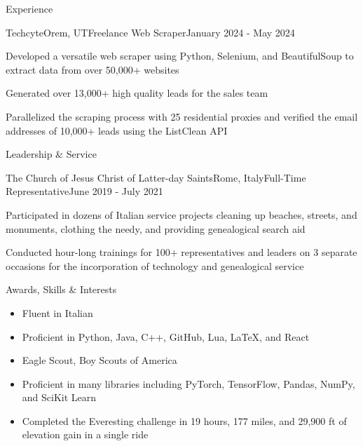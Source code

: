 \documentclass[
	10pt,
]{resume}
\begin{document}
\begin{rSection}{Experience}
\begin{rSubsection}{Techcyte}{Orem, UT}{Freelance Web Scraper}{January 2024 - May 2024}
		\item Developed a versatile web scraper using Python, Selenium, and BeautifulSoup to extract data from over 50,000+ websites
		\item Generated over 13,000+ high quality leads for the sales team
    \item Parallelized the scraping process with 25 residential proxies and verified the email addresses of 10,000+ leads using the ListClean API
	\end{rSubsection}


\end{rSection}


\begin{rSection}{Leadership \& Service}

	\begin{rSubsection}{The Church of Jesus Christ of Latter-day Saints}{Rome, Italy}{Full-Time Representative}{June 2019 - July 2021}
		\item Participated in dozens of Italian service projects cleaning up beaches, streets, and monuments, clothing the needy,
		and providing genealogical search aid
		\item Conducted hour-long trainings for 100+ representatives and leaders on 3 separate occasions for the incorporation of
		technology and genealogical service
	\end{rSubsection}

\end{rSection}

\begin{rSection}{Awards, Skills \& Interests}
	\begin{multicols}{2} %
		\begin{itemize}
			\item Fluent in Italian
			\item Proficient in Python, Java, C++, GitHub, Lua, LaTeX, and React
			\item Eagle Scout, Boy Scouts of America
			\item Proficient in many libraries including PyTorch, TensorFlow, Pandas, NumPy, and SciKit Learn
			\item Completed the Everesting challenge in 19 hours, 177 miles, and 29,900 ft of elevation gain in a single ride
		\end{itemize}
	\end{multicols} %
\end{rSection}
\end{document}
